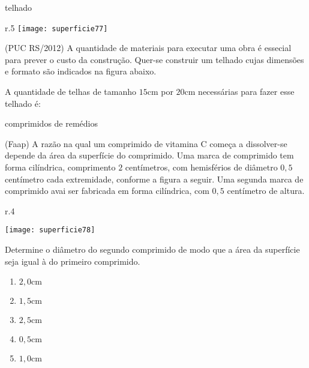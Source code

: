\begin{task}{telhado}
\begin{wrapfigure}{r}{.5\textwidth}
\centering
\texttt{[image: superficie77]}

\end{wrapfigure}
(PUC RS/2012) A quantidade de materiais para executar uma obra é essecial para prever o custo da construção. Quer-se construir um telhado cujas dimensões e formato são indicados na figura abaixo.

A quantidade de telhas de tamanho $15$cm por $20$cm necessárias para fazer esse telhado é:


\end{task}

\clearpage

\begin{task}{comprimidos de remédios}

(Faap) A razão na qual um comprimido de vitamina C começa a dissolver-se depende da área da superfície do comprimido. Uma marca de comprimido tem forma cilíndrica, comprimento $2$ centímetros, com hemisférios de diâmetro $0{,}5$ centímetro cada extremidade, conforme a figura a seguir. Uma segunda marca de comprimido avai ser fabricada em forma cilíndrica, com $0{,}5$ centímetro de altura.

\begin{wrapfigure}{r}{.4\textwidth}
\centering

\texttt{[image: superficie78]}
\end{wrapfigure}
Determine o diâmetro do segundo comprimido de modo que a área da superfície seja igual à do primeiro comprimido.

\begin{enumerate}
  \item $2{,}0\text{cm}$
  \item $1{,}5\text{cm}$
  \item $2{,}5\text{cm}$
  \item $0{,}5\text{cm}$
  \item $1{,}0\text{cm}$
\end{enumerate}
\end{task}

\exercise

